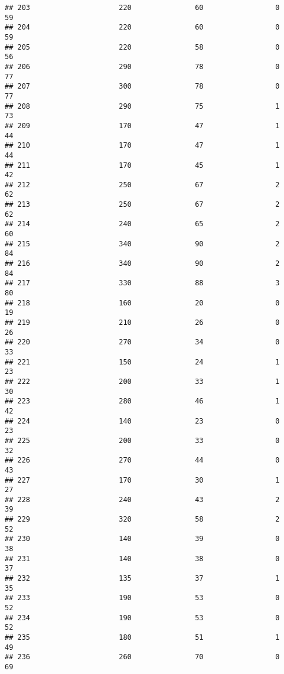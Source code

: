 \documentclass[
]{article}
\begin{document}
\begin{verbatim}
## 203                     220               60                 0         59
## 204                     220               60                 0         59
## 205                     220               58                 0         56
## 206                     290               78                 0         77
## 207                     300               78                 0         77
## 208                     290               75                 1         73
## 209                     170               47                 1         44
## 210                     170               47                 1         44
## 211                     170               45                 1         42
## 212                     250               67                 2         62
## 213                     250               67                 2         62
## 214                     240               65                 2         60
## 215                     340               90                 2         84
## 216                     340               90                 2         84
## 217                     330               88                 3         80
## 218                     160               20                 0         19
## 219                     210               26                 0         26
## 220                     270               34                 0         33
## 221                     150               24                 1         23
## 222                     200               33                 1         30
## 223                     280               46                 1         42
## 224                     140               23                 0         23
## 225                     200               33                 0         32
## 226                     270               44                 0         43
## 227                     170               30                 1         27
## 228                     240               43                 2         39
## 229                     320               58                 2         52
## 230                     140               39                 0         38
## 231                     140               38                 0         37
## 232                     135               37                 1         35
## 233                     190               53                 0         52
## 234                     190               53                 0         52
## 235                     180               51                 1         49
## 236                     260               70                 0         69

\end{verbatim}
\end{document}
